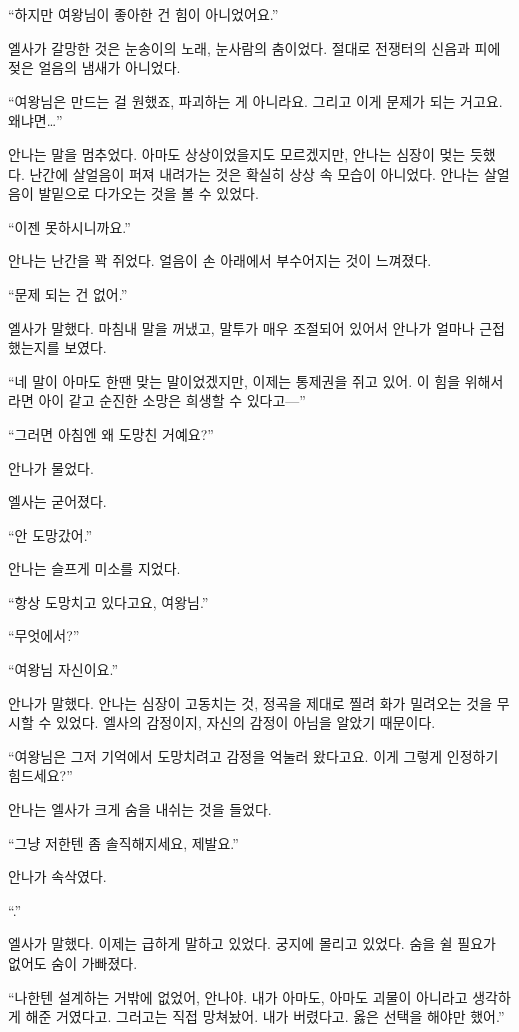 ``하지만 여왕님이 좋아한 건 힘이 아니었어요.''

엘사가 갈망한 것은 눈송이의 노래, 눈사람의 춤이었다. 절대로 전쟁터의 신음과 피에 젖은 얼음의 냄새가 아니었다.

``여왕님은 만드는 걸 원했죠, 파괴하는 게 아니라요. 그리고 이게 문제가 되는 거고요. 왜냐면\ldots''

안나는 말을 멈추었다. 아마도 상상이었을지도 모르겠지만, 안나는 심장이 멎는 듯했다. 난간에 살얼음이 퍼져 내려가는 것은 확실히 상상 속 모습이 아니었다. 안나는 살얼음이 발밑으로 다가오는 것을 볼 수 있었다.

``이젠 못하시니까요.''

안나는 난간을 꽉 쥐었다. 얼음이 손 아래에서 부수어지는 것이 느껴졌다.

``문제 되는 건 없어.''

엘사가 말했다. 마침내 말을 꺼냈고, 말투가 매우 조절되어 있어서 안나가 얼마나 근접했는지를 보였다.

``네 말이 아마도 한땐 맞는 말이었겠지만, 이제는 통제권을 쥐고 있어. 이 힘을 위해서라면 아이 같고 순진한 소망은 희생할 수 있다고—''

``그러면 아침엔 왜 도망친 거예요?''

안나가 물었다.

엘사는 굳어졌다.

``안 도망갔어.''

안나는 슬프게 미소를 지었다.

``항상 도망치고 있다고요, 여왕님.''

``무엇에서?''

``여왕님 자신이요.''

안나가 말했다. 안나는 심장이 고동치는 것, 정곡을 제대로 찔려 화가 밀려오는 것을 무시할 수 있었다. 엘사의 감정이지, 자신의 감정이 아님을 알았기 때문이다.

``여왕님은 그저 기억에서 도망치려고 감정을 억눌러 왔다고요. 이게 그렇게 인정하기 힘드세요?''

안나는 엘사가 크게 숨을 내쉬는 것을 들었다.

``그냥 저한텐 좀 솔직해지세요, 제발요.''

안나가 속삭였다.

``.''

엘사가 말했다. 이제는 급하게 말하고 있었다. 궁지에 몰리고 있었다. 숨을 쉴 필요가 없어도 숨이 가빠졌다.

``나한텐 설계하는 거밖에 없었어, 안나야. 내가 아마도, 아마도 괴물이 아니라고 생각하게 해준 거였다고. 그러고는 직접 망쳐놨어. 내가 버렸다고. 옳은 선택을 해야만 했어.''

